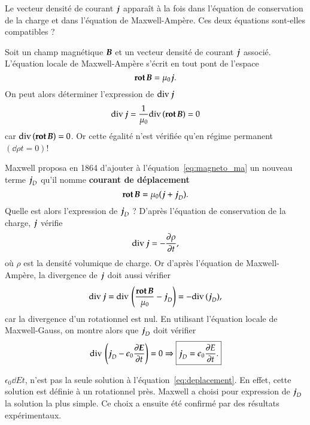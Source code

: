 Le vecteur densité de courant $\vecj$ apparaît à la fois dans l'équation 
de conservation de la charge et dans l'équation de Maxwell-Ampère. Ces deux
équations sont-elles compatibles ?

Soit un champ magnétique $\vecb$ et un vecteur densité de courant $\vecj$ 
associé. L'équation locale de Maxwell-Ampère s'écrit en tout pont de l'espace
\begin{equation*}
	\rot \vecb = \mu_0 \vecj.
\end{equation*}
On peut alors déterminer l'expression de $\div \vecj$
\begin{equation*}
	\div \vecj = \dfrac{1}{\mu_0} \div(\rot \vecb) = 0
\end{equation*}
car $\div(\rot \vecb) = 0$. Or cette égalité n'est vérifiée qu'en régime permanent 
$\left(\dd{\rho}{t} = 0 \right)$!

Maxwell proposa en 1864 d'ajouter à l'équation~\ref{eq:magneto_ma} un nouveau terme 
$\vecj_D$ qu'il nomme \textbf{courant de déplacement}
\begin{equation*}
	\rot \vecb = \mu_0 (\vecj + \vecj_D).
\end{equation*}
Quelle est alors l'expression de $\vecj_D$ ? D'après l'équation de conservation 
de la charge, $\vecj$ vérifie 
\begin{equation*}
	\div \vecj = -\dd{\rho}{t},
\end{equation*}
où $\rho$ est la densité volumique de charge. Or d'après l'équation de Maxwell-Ampère, 
la divergence de $\vecj$ doit aussi vérifier
\begin{equation*}
	\div \vecj = \div \left(\dfrac{\rot \vecb}{\mu_0} - \vecj_D \right)
	        = - \div(\vecj_D),
\end{equation*}
car la divergence d'un rotationnel est nul.
En utilisant l'équation locale de Maxwell-Gauss, on montre alors
que $\vecj_D$ doit vérifier
\begin{equation}
	\div \left(\vecj_D - \epsilon_0 \dd{\vece}{t}\right) = 0 \Rightarrow 
	\boxed{\vecj_D = \epsilon_0 \dd{E}{t}.}
	\label{eq:deplacement}
\end{equation}

\begin{rem}
	$\epsilon_0 \dd{E}{t}$, n'est pas la seule solution à 
	l'équation~\ref{eq:deplacement}. En effet, cette solution est définie
	à un rotationnel près. Maxwell a choisi pour expression de $\vecj_D$
	la solution la plus simple. Ce choix a ensuite été confirmé par des 
	résultats expérimentaux.
\end{rem}

